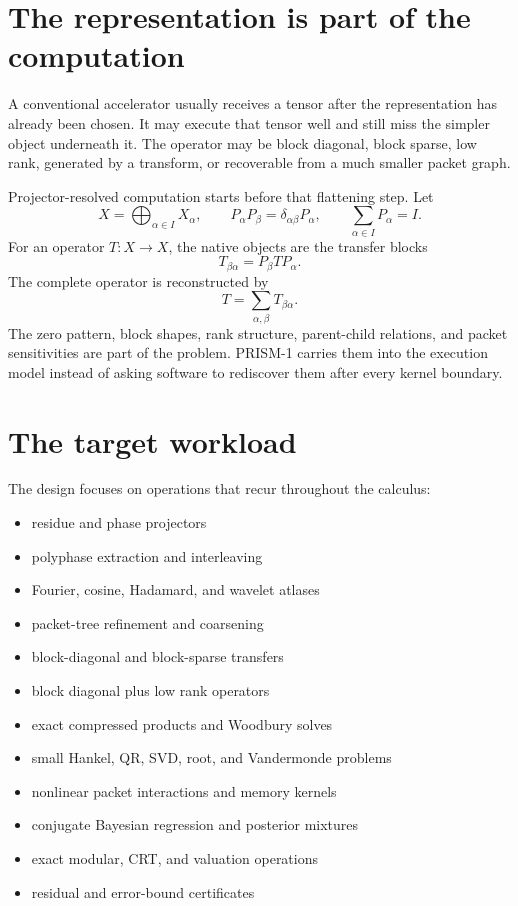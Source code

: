 \documentclass[11pt,oneside,openany]{book}
\theoremstyle{remark}
\begin{document}
\section{The representation is part of the computation}
A conventional accelerator usually receives a tensor after the representation has already been chosen. It may execute that tensor well and still miss the simpler object underneath it. The operator may be block diagonal, block sparse, low rank, generated by a transform, or recoverable from a much smaller packet graph.

Projector-resolved computation starts before that flattening step. Let
\[
X=\bigoplus_{\alpha\in I}X_\alpha,
\qquad
P_\alpha P_\beta=\delta_{\alpha\beta}P_\alpha,
\qquad
\sum_{\alpha\in I}P_\alpha=I.
\]
For an operator $T:X\to X$, the native objects are the transfer blocks
\[
T_{\beta\alpha}=P_\beta T P_\alpha.
\]
The complete operator is reconstructed by
\[
\boxed{T=\sum_{\alpha,\beta}T_{\beta\alpha}.}
\]
The zero pattern, block shapes, rank structure, parent-child relations, and packet sensitivities are part of the problem. PRISM-1 carries them into the execution model instead of asking software to rediscover them after every kernel boundary.

\section{The target workload}
The design focuses on operations that recur throughout the calculus:
\begin{itemize}
\item residue and phase projectors
\item polyphase extraction and interleaving
\item Fourier, cosine, Hadamard, and wavelet atlases
\item packet-tree refinement and coarsening
\item block-diagonal and block-sparse transfers
\item block diagonal plus low rank operators
\item exact compressed products and Woodbury solves
\item small Hankel, QR, SVD, root, and Vandermonde problems
\item nonlinear packet interactions and memory kernels
\item conjugate Bayesian regression and posterior mixtures
\item exact modular, CRT, and valuation operations
\item residual and error-bound certificates
\end{itemize}
\end{document}

